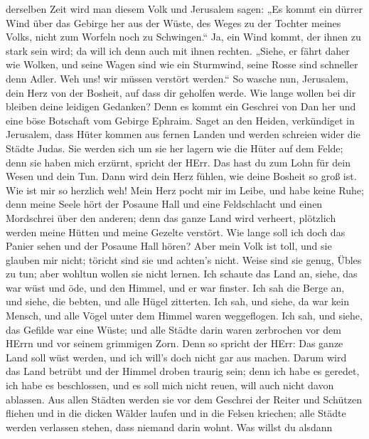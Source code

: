 derselben Zeit wird man diesem Volk und Jerusalem sagen: „Es kommt ein
dürrer Wind über das Gebirge her aus der Wüste, des Weges zu der Tochter
meines Volks, nicht zum Worfeln noch zu Schwingen.``  Ja,
ein Wind kommt, der ihnen zu stark sein wird; da will ich denn auch mit
ihnen rechten.  „Siehe, er fährt daher wie Wolken, und
seine Wagen sind wie ein Sturmwind, seine Rosse sind schneller denn
Adler. Weh uns! wir müssen verstört werden.``  So wasche
nun, Jerusalem, dein Herz von der Bosheit, auf dass dir geholfen werde.
Wie lange wollen bei dir bleiben deine leidigen Gedanken? 
Denn es kommt ein Geschrei von Dan her und eine böse Botschaft vom
Gebirge Ephraim.  Saget an den Heiden, verkündiget in
Jerusalem, dass Hüter kommen aus fernen Landen und werden schreien wider
die Städte Judas.  Sie werden sich um sie her lagern wie
die Hüter auf dem Felde; denn sie haben mich erzürnt, spricht der HErr.
 Das hast du zum Lohn für dein Wesen und dein Tun. Dann
wird dein Herz fühlen, wie deine Bosheit so groß ist.  Wie
ist mir so herzlich weh! Mein Herz pocht mir im Leibe, und habe keine
Ruhe; denn meine Seele hört der Posaune Hall und eine Feldschlacht
 und einen Mordschrei über den anderen; denn das ganze Land
wird verheert, plötzlich werden meine Hütten und meine Gezelte verstört.
 Wie lange soll ich doch das Panier sehen und der Posaune
Hall hören?  Aber mein Volk ist toll, und sie glauben mir
nicht; töricht sind sie und achten's nicht. Weise sind sie genug, Übles
zu tun; aber wohltun wollen sie nicht lernen.  Ich schaute
das Land an, siehe, das war wüst und öde, und den Himmel, und er war
finster.  Ich sah die Berge an, und siehe, die bebten, und
alle Hügel zitterten.  Ich sah, und siehe, da war kein
Mensch, und alle Vögel unter dem Himmel waren weggeflogen. 
Ich sah, und siehe, das Gefilde war eine Wüste; und alle Städte darin
waren zerbrochen vor dem HErrn und vor seinem grimmigen Zorn.
 Denn so spricht der HErr: Das ganze Land soll wüst werden,
und ich will's doch nicht gar aus machen.  Darum wird das
Land betrübt und der Himmel droben traurig sein; denn ich habe es
geredet, ich habe es beschlossen, und es soll mich nicht reuen, will
auch nicht davon ablassen.  Aus allen Städten werden sie
vor dem Geschrei der Reiter und Schützen fliehen und in die dicken
Wälder laufen und in die Felsen kriechen; alle Städte werden verlassen
stehen, dass niemand darin wohnt.  Was willst du alsdann
